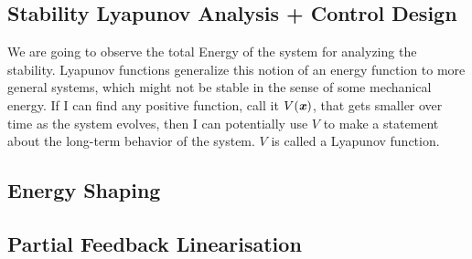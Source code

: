 \subsection{Stability Lyapunov Analysis + Control Design}
We are going to observe the total Energy of the system for analyzing the stability. Lyapunov functions generalize this notion of an energy function to more general systems, which might not be stable in the sense of some mechanical energy. If I can find any positive function, call it $V(\bm{\mathit{x}})$, that gets smaller over time as the system evolves, then I can potentially use $V$ to make a statement about the long-term behavior of the system. $V$ is called a Lyapunov function. 


\subsection{Energy Shaping}
\subsection{Partial Feedback Linearisation}

























